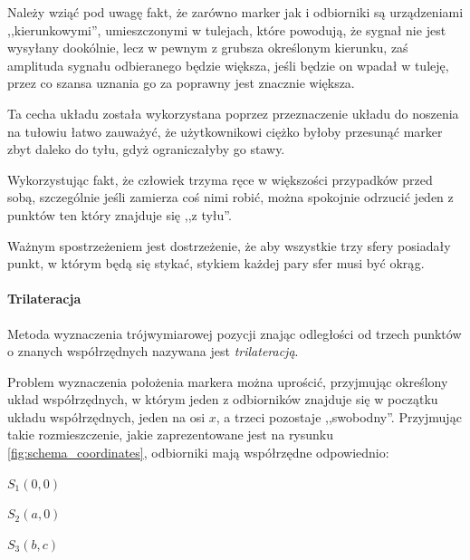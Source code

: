 Należy wziąć pod uwagę fakt, że zarówno marker jak i odbiorniki są urządzeniami ,,kierunkowymi'', umieszczonymi w tulejach, które powodują, że sygnał nie jest wysyłany dookólnie, lecz w pewnym \ppauza z grubsza określonym \ppauza kierunku, zaś amplituda sygnału odbieranego będzie większa, jeśli będzie on wpadał w tuleję, przez co szansa uznania go za poprawny jest znacznie większa.

Ta cecha układu została wykorzystana poprzez przeznaczenie układu do noszenia na tułowiu \ppauza łatwo zauważyć, że użytkownikowi ciężko byłoby przesunąć marker zbyt daleko do tyłu, gdyż ograniczałyby go stawy. 

Wykorzystując fakt, że człowiek trzyma ręce w większości przypadków przed sobą, szczególnie jeśli zamierza coś nimi robić, można spokojnie odrzucić jeden z punktów \ppauza ten który znajduje się ,,z tyłu''.

Ważnym spostrzeżeniem jest dostrzeżenie, że aby wszystkie trzy sfery posiadały punkt, w którym będą się stykać, stykiem każdej pary sfer musi być okrąg.

\paragraph{Trilateracja}
\label{par:trilateration}
Metoda wyznaczenia trójwymiarowej pozycji znając odległości od trzech punktów o znanych współrzędnych nazywana jest \textit{trilateracją}.

Problem wyznaczenia położenia markera można uprościć, przyjmując określony układ współrzędnych, w którym jeden z odbiorników znajduje się w początku układu współrzędnych, jeden na osi $x$, a trzeci pozostaje ,,swobodny''. Przyjmując takie rozmieszczenie, jakie zaprezentowane jest na rysunku \ref{fig:schema_coordinates}, odbiorniki mają współrzędne odpowiednio:
\begin{center}
 $S_1 (0, 0)$

 $S_2 (a, 0)$

 $S_3 (b, c)$
\end{center}

